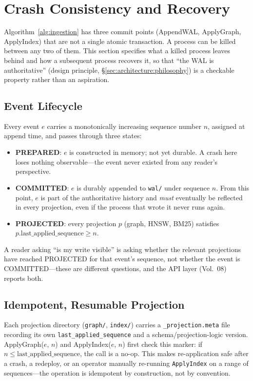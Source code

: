 \section{Crash Consistency and Recovery}
\label{sec:architecture:crash-consistency}

Algorithm~\ref{alg:ingestion} has three commit points (AppendWAL, ApplyGraph, ApplyIndex) that are not a single atomic transaction. A process can be killed between any two of them. This section specifies what a killed process leaves behind and how a subsequent process recovers it, so that ``the WAL is authoritative'' (design principle, \S\ref{sec:architecture:philosophy}) is a checkable property rather than an aspiration.

\subsection{Event Lifecycle}
Every event $e$ carries a monotonically increasing sequence number $n$, assigned at append time, and passes through three states:
\begin{itemize}
  \item \textbf{PREPARED}: $e$ is constructed in memory; not yet durable. A crash here loses nothing observable---the event never existed from any reader's perspective.
  \item \textbf{COMMITTED}: $e$ is durably appended to \texttt{wal/} under sequence $n$. From this point, $e$ is part of the authoritative history and \emph{must} eventually be reflected in every projection, even if the process that wrote it never runs again.
  \item \textbf{PROJECTED}: every projection $p$ (graph, HNSW, BM25) satisfies $p.\text{last\_applied\_sequence} \geq n$.
\end{itemize}
A reader asking ``is my write visible'' is asking whether the relevant projections have reached PROJECTED for that event's sequence, not whether the event is COMMITTED---these are different questions, and the API layer (Vol.~08) reports both.

\subsection{Idempotent, Resumable Projection}
Each projection directory (\texttt{graph/}, \texttt{index/}) carries a \texttt{\_projection.meta} file recording its own \texttt{last\_applied\_sequence} and a schema/projection-logic version. ApplyGraph($e$, $n$) and ApplyIndex($e$, $n$) first check this marker: if $n \leq \text{last\_applied\_sequence}$, the call is a no-op. This makes re-application safe after a crash, a redeploy, or an operator manually re-running \texttt{ApplyIndex} on a range of sequences---the operation is idempotent by construction, not by convention.

